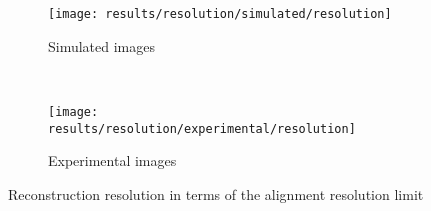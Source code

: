 \documentclass[../main.tex]{subfiles}
\begin{document}
\begin{figure}[htbp]
    \centering
    \begin{subfigure}[b]{.8\textwidth}
         \centering
         \texttt{[image: results/resolution/simulated/resolution]}
         \caption{Simulated images}
    \end{subfigure}\\
    \vspace{2em}
    \begin{subfigure}[b]{.8\textwidth}
         \centering
         \texttt{[image: results/resolution/experimental/resolution]}
         \caption{Experimental images}
    \end{subfigure}
    \caption{Reconstruction resolution in terms of the alignment resolution limit}
    \label{fig:5:resolution_resolution}
\end{figure}
\end{document}
